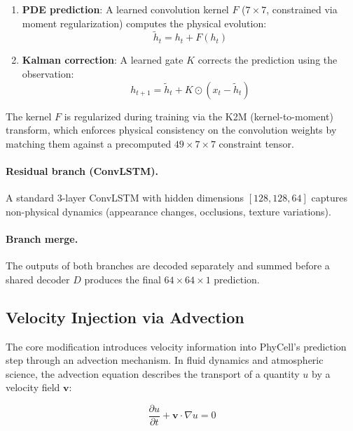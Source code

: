 \documentclass[11pt,a4paper]{article}
\begin{document}
\begin{enumerate}[nosep]
    \item \textbf{PDE prediction}: A learned convolution kernel $F$ ($7 \times 7$, constrained via moment regularization) computes the physical evolution:
    \begin{equation}
        \tilde{h}_t = h_t + F(h_t)
        \label{eq:pde}
    \end{equation}

    \item \textbf{Kalman correction}: A learned gate $K$ corrects the prediction using the observation:
    \begin{equation}
        h_{t+1} = \tilde{h}_t + K \odot (x_t - \tilde{h}_t)
        \label{eq:kalman}
    \end{equation}
\end{enumerate}

The kernel $F$ is regularized during training via the K2M (kernel-to-moment) transform, which enforces physical consistency on the convolution weights by matching them against a precomputed $49 \times 7 \times 7$ constraint tensor.

\paragraph{Residual branch (ConvLSTM).}
A standard 3-layer ConvLSTM with hidden dimensions $[128, 128, 64]$ captures non-physical dynamics (appearance changes, occlusions, texture variations).

\paragraph{Branch merge.}
The outputs of both branches are decoded separately and summed before a shared decoder $D$ produces the final $64 \times 64 \times 1$ prediction.

\subsection{Velocity Injection via Advection}
\label{sec:velocity}

The core modification introduces velocity information into PhyCell's prediction step through an advection mechanism. In fluid dynamics and atmospheric science, the advection equation describes the transport of a quantity $u$ by a velocity field $\mathbf{v}$:

\begin{equation}
    \frac{\partial u}{\partial t} + \mathbf{v} \cdot \nabla u = 0
    \label{eq:advection}
\end{equation}
\end{document}
